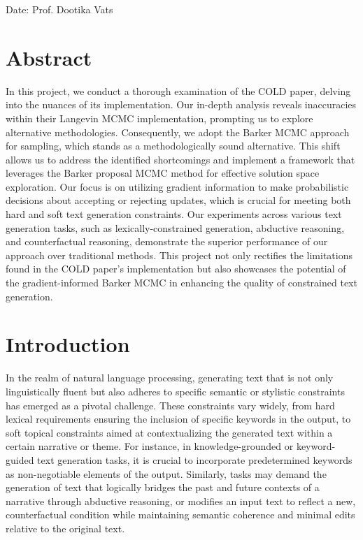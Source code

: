 \documentclass{article}
\begin{document}
\noindent Date: \hspace{7.5cm} Prof. Dootika Vats


\newpage
\vspace*{3cm}
\section*{Abstract}
In this project, we conduct a thorough examination of the COLD paper, delving into the nuances of its implementation. Our in-depth analysis reveals inaccuracies within their Langevin MCMC implementation, prompting us to explore alternative methodologies. Consequently, we adopt the Barker MCMC approach for sampling, which stands as a methodologically sound alternative. This shift allows us to address the identified shortcomings and implement a framework that leverages the Barker proposal MCMC method for effective solution space exploration. Our focus is on utilizing gradient information to make probabilistic decisions about accepting or rejecting updates, which is crucial for meeting both hard and soft text generation constraints. Our experiments across various text generation tasks, such as lexically-constrained generation, abductive reasoning, and counterfactual reasoning, demonstrate the superior performance of our approach over traditional methods. This project not only rectifies the limitations found in the COLD paper's implementation but also showcases the potential of the gradient-informed Barker MCMC in enhancing the quality of constrained text generation.
\newpage
\tableofcontents





\newpage
\newpage
{}


\section{Introduction}

In the realm of natural language processing, generating text that is not only linguistically fluent but also adheres to specific semantic or stylistic constraints has emerged as a pivotal challenge. These constraints vary widely, from hard lexical requirements ensuring the inclusion of specific keywords in the output, to soft topical constraints aimed at contextualizing the generated text within a certain narrative or theme. For instance, in knowledge-grounded or keyword-guided text generation tasks, it is crucial to incorporate predetermined keywords as non-negotiable elements of the output. Similarly, tasks may demand the generation of text that logically bridges the past and future contexts of a narrative through abductive reasoning, or modifies an input text to reflect a new, counterfactual condition while maintaining semantic coherence and minimal edits relative to the original text.
\end{document}
